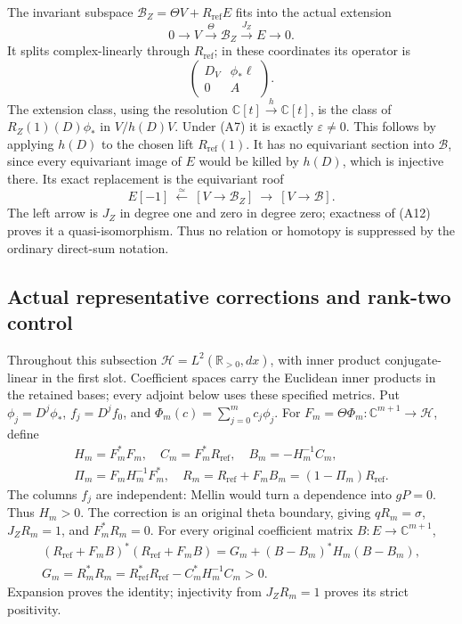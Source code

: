 The invariant subspace
\(\mathscr B_Z=\Theta V+R_{\mathrm{ref}}E\) fits into the actual extension
\[
 0\to V\xrightarrow{\Theta}\mathscr B_Z\xrightarrow{J_Z}E\to0.
 \tag{A12}
\]
It splits complex-linearly through \(R_{\mathrm{ref}}\); in these coordinates its
operator is
\[
 \begin{pmatrix}D_V&\phi_*\ell\\0&A\end{pmatrix}.
\]
The extension class, using the resolution
\(\mathbb{C}[t]\xrightarrow{h}\mathbb{C}[t]\), is the class of
\(R_Z(1)(D)\phi_*\) in \(V/h(D)V\).
Under (A7) it is exactly \(\varepsilon\neq0\).
This follows by applying \(h(D)\) to the chosen lift \(R_{\mathrm{ref}}(1)\).
It has no equivariant section into \(\mathscr B\), since every
equivariant image of \(E\) would be killed by \(h(D)\), which is
injective there. Its exact replacement is the equivariant roof
\[
 E[-1]\ \xleftarrow{\simeq}\
   [V\to\mathscr B_Z]\ \longrightarrow\ [V\to\mathscr B].
 \tag{A13}
\]
The left arrow is \(J_Z\) in degree one and zero in degree zero;
exactness of (A12) proves it a quasi-isomorphism.
Thus no relation or homotopy is suppressed by the ordinary
direct-sum notation.

\subsection{Actual representative corrections and rank-two control}
Throughout this subsection \(\mathscr H=L^2(\mathbb{R}_{>0},dx)\),
with inner product conjugate-linear in the first slot. Coefficient
spaces carry the Euclidean inner products in the retained bases;
every adjoint below uses these specified metrics.
Put \(\phi_j=D^j\phi_*\), \(f_j=D^jf_0\), and
\(\Phi_m(c)=\sum_{j=0}^mc_j\phi_j\).
For \(F_m=\Theta\Phi_m:\mathbb{C}^{m+1}\to\mathscr H\), define
\[
 \begin{gathered}
 H_m=F_m^*F_m,\quad C_m=F_m^*R_{\mathrm{ref}},\quad
 B_m=-H_m^{-1}C_m,\\
 \Pi_m=F_mH_m^{-1}F_m^*,\quad
 R_m=R_{\mathrm{ref}}+F_mB_m=(1-\Pi_m)R_{\mathrm{ref}}.
 \end{gathered}
 \tag{A14}
\]
The columns \(f_j\) are independent: Mellin would turn a dependence
into \(gP=0\). Thus \(H_m>0\).
The correction is an original theta boundary, giving
\(qR_m=\sigma\), \(J_ZR_m=1\), and \(F_m^*R_m=0\).
For every original coefficient matrix \(B:E\to\mathbb{C}^{m+1}\),
\[
 \begin{gathered}
 (R_{\mathrm{ref}}+F_mB)^*(R_{\mathrm{ref}}+F_mB)
       =G_m+(B-B_m)^*H_m(B-B_m),\\
 G_m=R_m^*R_m=R_{\mathrm{ref}}^*R_{\mathrm{ref}}-C_m^*H_m^{-1}C_m>0 .
 \end{gathered}
 \tag{A15}
\]
Expansion proves the identity; injectivity from \(J_ZR_m=1\)
proves its strict positivity.

